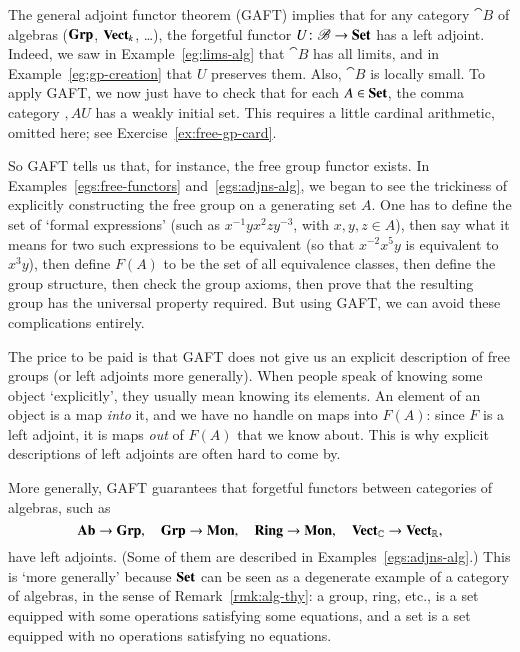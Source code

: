 \begin{example} 
\label{eg:gaft-free-alg}
The general adjoint functor theorem (GAFT) implies that for any category
$\cat{B}$ of algebras ($\mathbf{Grp}$, $\mathbf{Vect}_k$, \ldots), the forgetful%
%
%
functor $U\from \cat{B} \to \Set$ has a left adjoint.  Indeed, we saw in
Example~\ref{eg:lims-alg} that $\cat{B}$ has all limits, and in
Example~\ref{eg:gp-creation} that $U$ preserves them.  Also, $\cat{B}$ is
locally small.  To apply GAFT, we now just have to check that for each $A
\in \mathbf{Set}$, the comma category $\comma{A}{U}$ has a weakly initial set.
This requires a little cardinal%
%
%
%
arithmetic, omitted here; see Exercise~\ref{ex:free-gp-card}.

So GAFT tells us that, for instance, the free group%
%
%
functor exists.  In Examples~\ref{egs:free-functors}
and~\ref{egs:adjns-alg}, we began to see the
trickiness of explicitly constructing the free group on a generating set
$A$.  One has to define the set of `formal expressions' (such as $x^{-1} y
x^2 z y^{-3}$, with $x, y, z \in A$), then say what it means for two such
expressions to be equivalent (so that $x^{-2} x^5 y$ is equivalent to $x^3
y$), then define $F(A)$ to be the set of all equivalence classes, then
define the group structure, then check the group axioms, then prove that
the resulting group has the universal property required.  But using GAFT,
we can avoid these complications entirely.

The price to be paid is that GAFT does not give us an explicit%
%
%
description of free groups (or left adjoints more generally).  When people
speak of knowing some object `explicitly', they usually mean knowing its
elements.  An element of an object is a map \emph{into} it, and we have no
handle on maps into $F(A)$: since $F$ is a left adjoint, it is maps
\emph{out} of $F(A)$ that we know about.  This is why explicit descriptions
of left adjoints are often hard to come by.
\end{example}

\begin{example}
More generally, GAFT guarantees that forgetful%
%
%
functors between categories of algebras, such as
\[
\mathbf{Ab} \to \mathbf{Grp}, 
\quad
\mathbf{Grp} \to \mathbf{Mon},
\quad
\mathbf{Ring} \to \mathbf{Mon},
\quad
\mathbf{Vect}_{\mathbb{C}} \to \mathbf{Vect}_{\mathbb{R}},
\]
have left adjoints.  (Some of them are described in
Examples~\ref{egs:adjns-alg}.)  This is `more generally' because $\mathbf{Set}$ can
be seen as a degenerate example of a category of algebras, in the sense of
Remark~\ref{rmk:alg-thy}: a group, ring, etc., is a set equipped with some
operations satisfying some equations, and a set is a set equipped with no
operations satisfying no equations.
\end{example}

